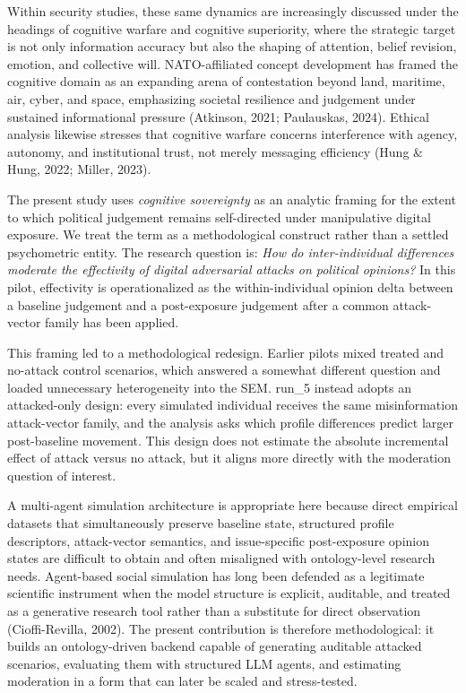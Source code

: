 \documentclass[11pt]{article}
\begin{document}
Within security studies, these same dynamics are increasingly discussed under the headings of cognitive warfare and cognitive superiority, where the strategic target is not only information accuracy but also the shaping of attention, belief revision, emotion, and collective will. NATO-affiliated concept development has framed the cognitive domain as an expanding arena of contestation beyond land, maritime, air, cyber, and space, emphasizing societal resilience and judgement under sustained informational pressure (Atkinson, 2021; Paulauskas, 2024). Ethical analysis likewise stresses that cognitive warfare concerns interference with agency, autonomy, and institutional trust, not merely messaging efficiency (Hung \& Hung, 2022; Miller, 2023).

The present study uses \textit{cognitive sovereignty} as an analytic framing for the extent to which political judgement remains self-directed under manipulative digital exposure. We treat the term as a methodological construct rather than a settled psychometric entity. The research question is: \textit{How do inter-individual differences moderate the effectivity of digital adversarial attacks on political opinions?} In this pilot, effectivity is operationalized as the within-individual opinion delta between a baseline judgement and a post-exposure judgement after a common attack-vector family has been applied.

This framing led to a methodological redesign. Earlier pilots mixed treated and no-attack control scenarios, which answered a somewhat different question and loaded unnecessary heterogeneity into the SEM. run\_5 instead adopts an attacked-only design: every simulated individual receives the same misinformation attack-vector family, and the analysis asks which profile differences predict larger post-baseline movement. This design does not estimate the absolute incremental effect of attack versus no attack, but it aligns more directly with the moderation question of interest.

A multi-agent simulation architecture is appropriate here because direct empirical datasets that simultaneously preserve baseline state, structured profile descriptors, attack-vector semantics, and issue-specific post-exposure opinion states are difficult to obtain and often misaligned with ontology-level research needs. Agent-based social simulation has long been defended as a legitimate scientific instrument when the model structure is explicit, auditable, and treated as a generative research tool rather than a substitute for direct observation (Cioffi-Revilla, 2002). The present contribution is therefore methodological: it builds an ontology-driven backend capable of generating auditable attacked scenarios, evaluating them with structured LLM agents, and estimating moderation in a form that can later be scaled and stress-tested.
\end{document}
